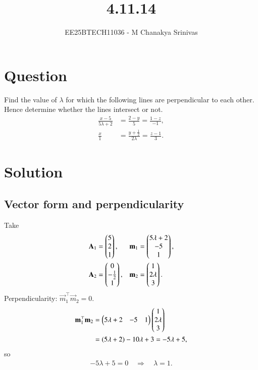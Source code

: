 \documentclass[journal]{IEEEtran}
\begin{document}

\vspace{3cm}

\title{4.11.14}
\author{EE25BTECH11036 - M Chanakya Srinivas}
\maketitle

\renewcommand{\thetable}{\theenumi}
\setlength{\intextsep}{10pt}
\renewcommand\theequation{\arabic{equation}}

\section*{Question}
Find the value of \(\lambda\) for which the following lines are perpendicular to each other. Hence determine whether the lines intersect or not.
\begin{align}
\frac{x-5}{5\lambda+2} &= \frac{2-y}{5} = \frac{1-z}{-1}, \label{eq:l1}\\
\frac{x}{1} &= \frac{y+\tfrac{1}{2}}{2\lambda} = \frac{z-1}{3}. \label{eq:l2}
\end{align}




\section*{Solution}

\subsection*{Vector form and perpendicularity}
Take
\begin{align}
\mathbf{A}_1 &= \begin{pmatrix}5\\2\\1\end{pmatrix}, & \mathbf{m}_1 &= \begin{pmatrix}5\lambda+2\\-5\\1\end{pmatrix}, \\
\mathbf{A}_2 &= \begin{pmatrix}0\\-\tfrac12\\1\end{pmatrix}, & \mathbf{m}_2 &= \begin{pmatrix}1\\2\lambda\\3\end{pmatrix}.
\end{align}
Perpendicularity: \(\vec{m}_1^\top\vec{m}_2=0\).
\begin{align}
\mathbf{m}_1^\top\mathbf{m}_2
&= \begin{pmatrix}5\lambda+2 & -5 & 1\end{pmatrix}\begin{pmatrix}1\\2\lambda\\3\end{pmatrix} \\
&= (5\lambda+2) -10\lambda +3 = -5\lambda+5,
\end{align}
so
\begin{align}
-5\lambda+5=0 \quad\Longrightarrow\quad \boxed{\lambda=1}.
\end{align}
\end{document}
